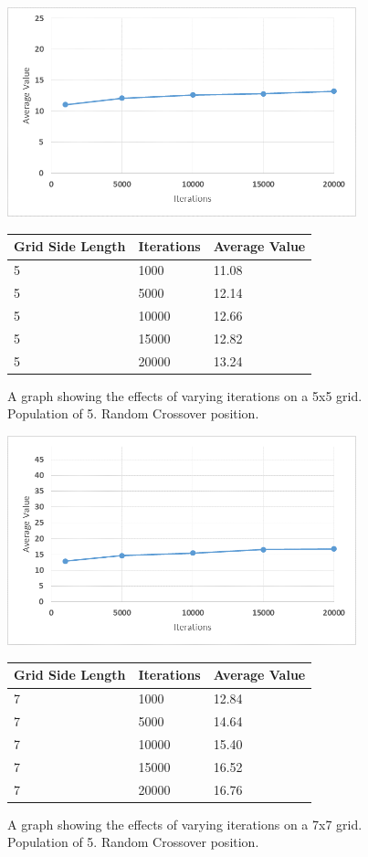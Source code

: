 \documentclass[12pt]{article}
\begin{document}
\begin{figure}[H]
    \centering
    \includegraphics[width=0.9\textwidth]{5x5_GA_Iteration}
\begin{tabular}{ |p{4cm}||p{4cm}|p{4cm}|  }
 \hline
Grid Side Length&Iterations&Average Value\\
 \hline
5&1000&11.08\\
5&5000&12.14\\
5&10000&12.66\\
5&15000&12.82\\
5&20000&13.24\\
 \hline
\end{tabular}
    \caption{A graph showing the effects of varying iterations on a 5x5 grid. Population of 5. Random Crossover position.}
    \label{fig:GApop5x5}
\end{figure}

\begin{figure}[H]
    \centering
    \includegraphics[width=0.9\textwidth]{7x7_GA_Iteration}
\begin{tabular}{ |p{4cm}||p{4cm}|p{4cm}|  }
 \hline
Grid Side Length&Iterations&Average Value\\
 \hline
7&1000&12.84\\
7&5000&14.64\\
7&10000&15.40\\
7&15000&16.52\\
7&20000&16.76\\
 \hline
\end{tabular}
    \caption{A graph showing the effects of varying iterations on a 7x7 grid. Population of 5. Random Crossover position.}
    \label{fig:GApop7x7}
\end{figure}
\end{document}
